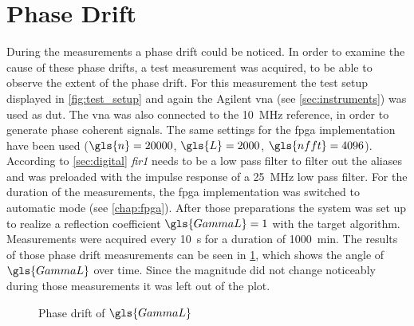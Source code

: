 \documentclass[12pt,a4paper,parskip=full,abstract=true,BCOR=12mm,twoside,open=right]{scrreprt}
\def\device#1{\textit{#1}}
\begin{document}

\section{Phase Drift}
\label{sec:drift}

During the measurements a phase drift could be noticed. In order to examine the
cause of these phase drifts, a test measurement was acquired, to be able
to observe the extent of the phase drift. For this measurement the test setup
displayed in \cref{fig:test_setup} and again the Agilent \gls{vna} (see \cref{sec:instruments})
was used as \gls{dut}. The \gls{vna} was also connected to the
\SI{10}{\mega\hertz} reference, in order to generate phase coherent signals. The same
settings for the \gls{fpga} implementation have been used ($\gls{n} = 20000$, $\gls{L} = 2000$, $\gls{nfft} = 4096$).
According to \cref{sec:digital} \device{fir1} needs to be a low pass filter to
filter out the aliases and was preloaded with the impulse response of a \SI{25}{\mega\hertz} low pass filter.
For the duration of the measurements,
the \gls{fpga} implementation was switched to automatic mode (see \cref{chap:fpga}). After
those preparations the system was set up to realize a reflection coefficient $\gls{GammaL} = 1$ with
the target algorithm. Measurements were acquired every \SI{10}{\second} for a duration
of \SI{1000}{\minute}. The results of those phase drift measurements can be seen in
\cref{fig:phase_single}, which shows the angle of $\gls{GammaL}$ over time. Since the magnitude did not change noticeably during those measurements
it was left out of the plot.

\begin{figure}[htb]
    \centering
    \caption{Phase drift of $\gls{GammaL}$}
    \label{fig:phase_single}
\end{figure}
\end{document}
